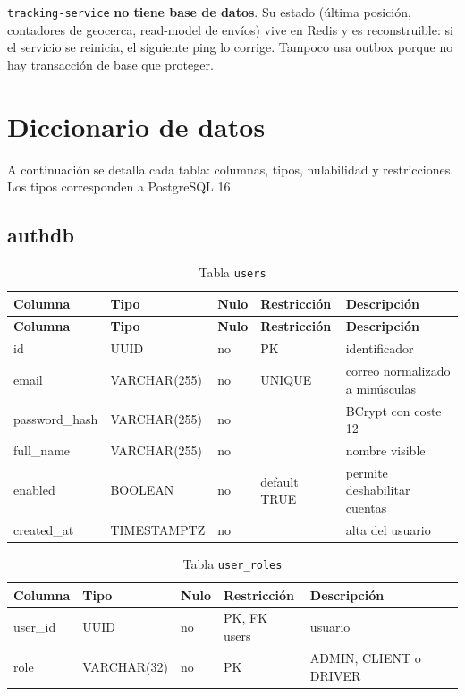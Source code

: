 \documentclass[10pt,letterpaper,twocolumn,oneside]{report}
\newcommand{\pkg}[1]{\texttt{#1}}
\begin{document}
\begin{alerta}[¿Y tracking?]
\pkg{tracking-service} \textbf{no tiene base de datos}. Su estado (última posición, contadores de
geocerca, read-model de envíos) vive en Redis y es reconstruible: si el servicio se reinicia, el
siguiente ping lo corrige. Tampoco usa outbox porque no hay transacción de base que proteger.
\end{alerta}

\section{Diccionario de datos}

A continuación se detalla cada tabla: columnas, tipos, nulabilidad y restricciones. Los tipos
corresponden a PostgreSQL 16.

\subsection{authdb}

\begin{longtable}{@{}L{3.4cm}L{3.2cm}L{1.2cm}L{3.6cm}L{3.4cm}@{}}
\caption{Tabla \pkg{users}}\\
\toprule
\textbf{Columna} & \textbf{Tipo} & \textbf{Nulo} & \textbf{Restricción} & \textbf{Descripción}\\
\midrule
\endfirsthead
\toprule
\textbf{Columna} & \textbf{Tipo} & \textbf{Nulo} & \textbf{Restricción} & \textbf{Descripción}\\
\midrule
\endhead
id & UUID & no & PK & identificador\\
email & VARCHAR(255) & no & UNIQUE & correo normalizado a minúsculas\\
password\_hash & VARCHAR(255) & no & & BCrypt con coste 12\\
full\_name & VARCHAR(255) & no & & nombre visible\\
enabled & BOOLEAN & no & default TRUE & permite deshabilitar cuentas\\
created\_at & TIMESTAMPTZ & no & & alta del usuario\\
\bottomrule
\end{longtable}

\begin{longtable}{@{}L{3.4cm}L{3.2cm}L{1.2cm}L{3.6cm}L{3.4cm}@{}}
\caption{Tabla \pkg{user\_roles}}\\
\toprule
\textbf{Columna} & \textbf{Tipo} & \textbf{Nulo} & \textbf{Restricción} & \textbf{Descripción}\\
\midrule
\endhead
user\_id & UUID & no & PK, FK users & usuario\\
role & VARCHAR(32) & no & PK & ADMIN, CLIENT o DRIVER\\
\bottomrule
\end{longtable}
\end{document}
